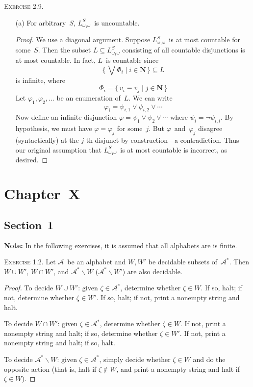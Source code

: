 \documentclass[letterpaper]{article}
\newcommand{\N}{\mathbf{N}}
\newcommand{\lequ}{\equiv}
\newcommand{\union}{\cup}
\newcommand{\sect}{\cap}
\newcommand{\LLo}{L_{\omega_1\omega}}
\newcommand{\biglor}{\textstyle{\bigvee}}
\theoremstyle{remark}
\begin{document}
\noindent\textsc{Exercise 2.9.}
\begin{enumerate}
\item[(a)] For arbitrary~$S$, $\LLo^S$~is uncountable.
\begin{proof}
We use a diagonal argument. Suppose $\LLo^S$~is at most countable for some~$S$. Then the subset $L\subseteq\LLo^S$ consisting of all countable disjunctions is at most countable. In fact, $L$~is countable since
$$\{\,\biglor\Phi_i\mid i\in\N\,\}\subseteq L$$
is infinite, where
$$\Phi_i=\{\,v_i\lequ v_j\mid j\in\N\,\}$$
Let $\varphi_1,\varphi_2,\ldots$ be an enumeration of~$L$. We can write
$$\varphi_i=\psi_{i,1}\lor\psi_{i,2}\lor\cdots$$
Now define an infinite disjunction $\varphi=\psi_1\lor\psi_2\lor\cdots$ where $\psi_i=\lnot\psi_{i,i}$. By hypothesis, we must have $\varphi=\varphi_j$ for some~$j$. But $\varphi$~and~$\varphi_j$ disagree (syntactically) at the $j$-th disjunct by construction---a contradiction. Thus our original assumption that $\LLo^S$~is at most countable is incorrect, as desired.
\end{proof}
\end{enumerate}

\section*{Chapter~X}

\subsection*{Section~1}
\noindent\textbf{Note:} In the following exercises, it is assumed that all alphabets are is finite.

\bigskip\noindent\textsc{Exercise 1.2.}
Let $\mathcal{A}$~be an alphabet and $W,W'$ be decidable subsets of~$\mathcal{A}^*$. Then $W\union W'$, $W\sect W'$, and $\mathcal{A}^*\backslash W$ ($\mathcal{A}^*\backslash W'$) are also decidable.
\begin{proof}
To decide $W\union W'$: given $\zeta\in\mathcal{A}^*$, determine whether $\zeta\in W$. If so, halt; if not, determine whether $\zeta\in W'$. If so, halt; if not, print a nonempty string and halt.

To decide $W\sect W'$: given $\zeta\in\mathcal{A}^*$, determine whether $\zeta\in W$. If not, print a nonempty string and halt; if so, determine whether $\zeta\in W'$. If not, print a nonempty string and halt; if so, halt.

To decide $\mathcal{A}^*\backslash W$: given $\zeta\in\mathcal{A}^*$, simply decide whether $\zeta\in W$ and do the opposite action (that is, halt if $\zeta\not\in W$, and print a nonempty string and halt if $\zeta\in W$).
\end{proof}
\end{document}
